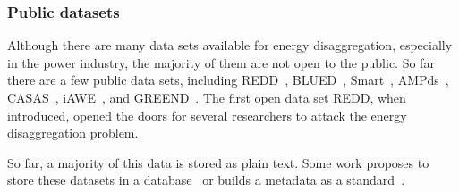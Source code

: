 %

\subsubsection{Public datasets}
Although there are many data sets available for energy disaggregation, 
especially in the power industry, 
the majority of them are not open to the public. 
So far there are a few public data sets, including REDD~\cite{kolter2010redd},
BLUED~\cite{anderson2012blued}, Smart~\cite{barker2012smart}, 
AMPds~\cite{makonin2013ampds}, CASAS~\cite{cook2013CASAS}, iAWE~\cite{batra2013different}, 
and GREEND~\cite{monacchi2014greend}. %
The first open data set REDD, when introduced, opened the doors for several 
researchers to attack the energy disaggregation problem.

So far, a majority of this data is stored as plain text. 
Some work proposes to store these datasets in a database~\cite{lai2012database}  
or builds a metadata as a standard~\cite{kelly2014metadata}. 

